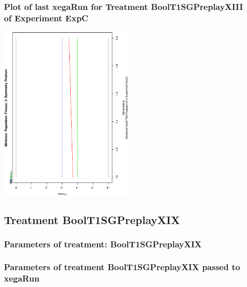 \documentclass[18pt,c]{beamer}
\makeatletter
\def\beamer@writeslidentry@miniframesoff{%
  \expandafter\beamer@ifempty\expandafter{\beamer@framestartpage}{}%
  {%
   \clearpage\beamer@notesactions%
  }
}
\newcommand*{\miniframesoff}{\let\beamer@writeslidentry=\beamer@writeslidentry@miniframesoff}
\makeatother
\begin{document}
 \begin{frame}
 \frametitle{ Plot of last xegaRun for Treatment BoolT1SGPreplayXIII of Experiment ExpC }
 \begin{center}
\includegraphics[width=0.5\textwidth, angle=-90]
{ExpCPlotPopStatsFigure000.eps}
 \end{center}
 \label{report/ExpCPlotPopStatsFigure000.eps}  
 \end{frame}

\miniframesoff
\subsection{Treatment BoolT1SGPreplayXIX}

 \begin{frame}
 \fontsize{8pt}{9pt}\selectfont
 \frametitle{  Parameters of treatment: BoolT1SGPreplayXIX 
 }

 \label{ExpCtParmTable004.tex}  
 \end{frame}


 \begin{frame}
 \fontsize{8pt}{9pt}\selectfont
 \frametitle{  Parameters of treatment BoolT1SGPreplayXIX passed to xegaRun
 }

 \label{ExpCtParmTable005.tex}  
 \end{frame}
\end{document}
